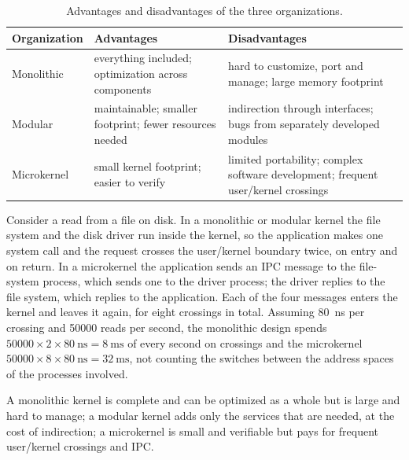 \documentclass[../main.tex]{subfiles}
\begin{document}
\begin{table}[htbp]
  \centering
  \caption{Advantages and disadvantages of the three organizations.}
  \label{tab:l01-organization}
  \small
  \begin{tabular}{@{}>{\RaggedRight}p{19mm}>{\RaggedRight}p{46mm}%
      >{\RaggedRight\arraybackslash}p{47mm}@{}}
    \toprule
    Organization & Advantages & Disadvantages \\
    \midrule
    Monolithic & everything included; optimization across components
      & hard to customize, port and manage; large memory footprint \\
    \addlinespace
    Modular & maintainable; smaller footprint; fewer resources needed
      & indirection through interfaces; bugs from separately developed
      modules \\
    \addlinespace
    Microkernel & small kernel footprint; easier to verify
      & limited portability; complex software development; frequent
      user/kernel crossings \\
    \bottomrule
  \end{tabular}
\end{table}

\begin{example}
  Consider a read from a file on disk.  In a monolithic or modular kernel
  the file system and the disk driver run inside the kernel, so the
  application makes one system call and the request crosses the user/kernel
  boundary twice, on entry and on return.  In a microkernel the application
  sends an IPC message to the file-system process, which sends one to the
  driver process; the driver replies to the file system, which replies to
  the application.  Each of the four messages enters the kernel and leaves
  it again, for eight crossings in total.  Assuming \SI{80}{\nano\second}
  per crossing and \num{50000} reads per second, the monolithic design
  spends $\num{50000}\times 2\times\SI{80}{\nano\second} =
  \SI{8}{\milli\second}$ of every second on crossings and the microkernel
  $\num{50000}\times 8\times\SI{80}{\nano\second} =
  \SI{32}{\milli\second}$, not counting the switches between the address
  spaces of the processes involved.
\end{example}

\begin{keypoint}
  A monolithic kernel is complete and can be optimized as a whole but is
  large and hard to manage; a modular kernel adds only the services that
  are needed, at the cost of indirection; a microkernel is small and
  verifiable but pays for frequent user/kernel crossings and IPC.
\end{keypoint}
\end{document}
